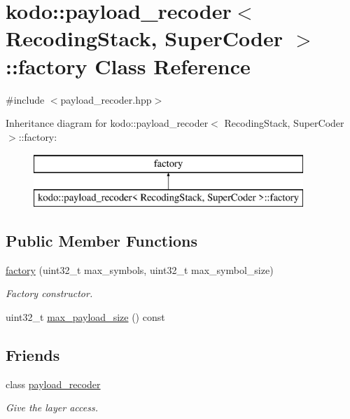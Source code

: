 \hypertarget{classkodo_1_1payload__recoder_1_1factory}{\section{kodo\-:\-:payload\-\_\-recoder$<$ Recoding\-Stack, Super\-Coder $>$\-:\-:factory Class Reference}
\label{classkodo_1_1payload__recoder_1_1factory}
}


{\ttfamily \#include $<$payload\-\_\-recoder.\-hpp$>$}

Inheritance diagram for kodo\-:\-:payload\-\_\-recoder$<$ Recoding\-Stack, Super\-Coder $>$\-:\-:factory\-:\begin{figure}[H]
\begin{center}
\leavevmode
\includegraphics[height=2.000000cm]{classkodo_1_1payload__recoder_1_1factory}
\end{center}
\end{figure}
\subsection*{Public Member Functions}
\begin{DoxyCompactItemize}
\item 
\hyperlink{classkodo_1_1payload__recoder_1_1factory_ad7e9a156189349442f5130ebe6a39c43}{factory} (uint32\-\_\-t max\-\_\-symbols, uint32\-\_\-t max\-\_\-symbol\-\_\-size)
\begin{DoxyCompactList}\small\item\em Factory constructor. \end{DoxyCompactList}\item 
uint32\-\_\-t \hyperlink{classkodo_1_1payload__recoder_1_1factory_ae04ca4799a7bd8972863ae6eb1b8e046}{max\-\_\-payload\-\_\-size} () const 
\begin{DoxyCompactList}\small\item\em \end{DoxyCompactList}\end{DoxyCompactItemize}
\subsection*{Friends}
\begin{DoxyCompactItemize}
\item 
\hypertarget{classkodo_1_1payload__recoder_1_1factory_a78b709976a0bab92c8658aa2374db503}{class \hyperlink{classkodo_1_1payload__recoder_1_1factory_a78b709976a0bab92c8658aa2374db503}{payload\-\_\-recoder}}\label{classkodo_1_1payload__recoder_1_1factory_a78b709976a0bab92c8658aa2374db503}

\begin{DoxyCompactList}\small\item\em Give the layer access. \end{DoxyCompactList}\end{DoxyCompactItemize}


